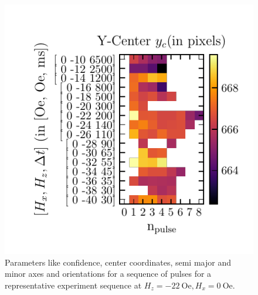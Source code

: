 \documentclass[12pt, twoside, a4paper]{article}
\begin{document}
\begin{figure}[!htbp]
	\includegraphics[scale=1.0]{figures/12_FitsFullSpace/0_1_2_3_4_5_6_7_8_9_10_11_12_13_14_15__Y-Center.pdf}
	\caption{Parameters like confidence, center coordinates, semi major and minor axes and orientations for a sequence of pulses for a representative experiment sequence at $H_z = -22~\mathrm{Oe}, H_x = 0~\mathrm{Oe}$.
	}
	\label{openCV fit parameters all experiments}
\end{figure}
%
\clearpage
\end{document}
